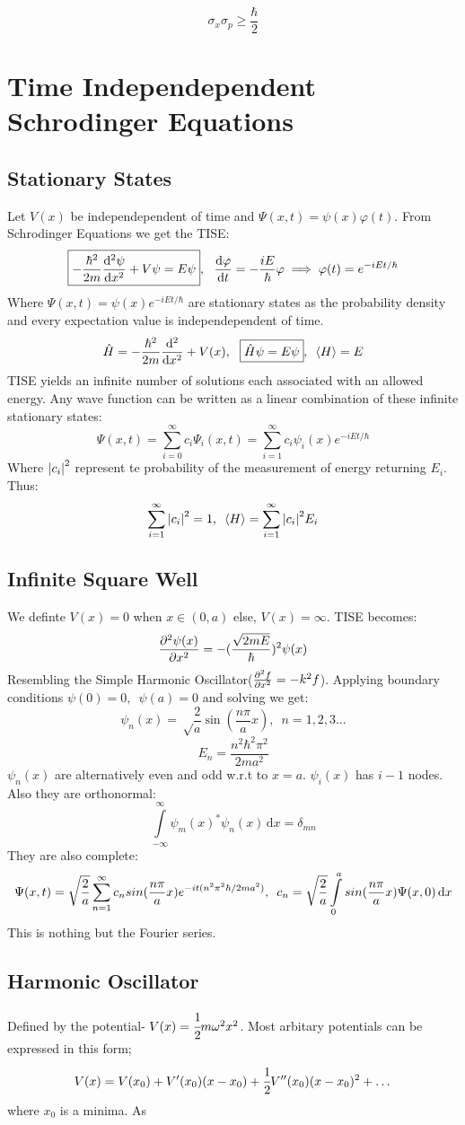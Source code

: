 \documentclass{article}
\newcommand{\s}[2]{\sum_{#1}^{#2}}
\renewcommand{\i}[4]{\int\limits_{#3}^{#4}{#1}\,\mathrm{d}{#2}}
\newcommand{\p}{\psi}
\renewcommand{\P}{\Psi}
\newcommand{\px}{\psi(x)}
\newcommand{\Pxt}{\Psi(x,t)}
\begin{document}
$$\sigma_x\sigma_p\geq\frac{\hbar}{2}$$
\section{Time Independependent Schrodinger Equations}
\subsection{Stationary States}
Let $V(x)$ be independependent of time and $\Pxt=\px\varphi(t)$. From Schrodinger Equations we get the TISE:
$$\boxed{-\frac{\hbar^2}{2m}\dv[2]{\p}{x}+V\p=E\p},\,\,\,\,\dv{\varphi}{t}=-\frac{iE}{\hbar}\varphi\implies\varphi(t)=e^{-iEt/\hbar}$$
Where $\Pxt=\px e^{-iEt/\hbar}$ are stationary states as the probability density and every expectation value is independependent of time. 
$$\hat{H}=-\frac{\hbar^2}{2m}\dv[2]{}{x}+V(x), \,\,\,\, \boxed{\hat{H}\p=E\p},\,\,\,\ev{H}=E$$
TISE yields an infinite number of solutions each associated with an allowed energy.
 Any wave function can be written as a linear combination of these infinite stationary states:
 $$\Pxt=\s{i=0}{\infty}c_i\P_i(x,t)=\s{i=1}{\infty}c_i  \p_i(x)e^{-iEt/\hbar}$$
Where $\abs{c_i}^2$ represent te probability of the measurement of energy returning $E_i$. Thus:
$$\s{i=1}{\infty}\abs{c_i}^2=1,\,\,\, \ev{H}=\s{i=1}{\infty}\abs{c_i}^2E_i$$
\subsection{Infinite Square Well}
We definte $V(x)=0$ when $x\in(0,a)$ else, $V(x)=\infty$. TISE becomes:
$$\pdv[2]{\px}{x}=-(\frac{\sqrt{2mE}}{\hbar})^2\px$$
Resembling the Simple Harmonic Oscillator($\pdv[2]{f}{x}=-k^2f$). Applying boundary conditions $\p (0)=0,\,\,\,\p(a)=0$ and solving we get:
$$\p_n(x)=\sqrt\frac{2}{a}\sin(\frac{n\pi}{a}x),\,\,\,n=1,2,3\hdots$$
$$E_n=\frac{n^2\hbar^2\pi^2}{2ma^2}$$
$\p_n(x)$ are alternatively even and odd w.r.t to $x=a$. $\p_i(x)$ has $i-1$ nodes. Also they are orthonormal:
$$\i{\p_m(x)^*\p_n(x)}{x}{-\infty}{\infty}=\delta_{mn}$$ 
They are also complete:
$$\Pxt=\sqrt{\frac{2}{a}}\s{n=1}{\infty}c_nsin(\frac{n\pi}{a}x)e^{-it(n^2\pi^2\hbar/2ma^2)}
\\,\,\,\,c_n=\sqrt{\frac{2}{a}}\i{sin(\frac{n\pi}{a}x)\P(x,0)}{x}{0}{a}$$
This is nothing but the Fourier series.
\subsection{Harmonic Oscillator}
Defined by the potential- $V(x)=\cfrac{1}{2}m\omega^2x^2$. Most arbitary potentials can be expressed in this form;
$$V(x) = V(x_0)+V'(x_0)(x-x_0)+\cfrac{1}{2}V''(x_0)(x-x_0)^2+\dots$$
where $x_0$ is a minima. As
\end{document}
